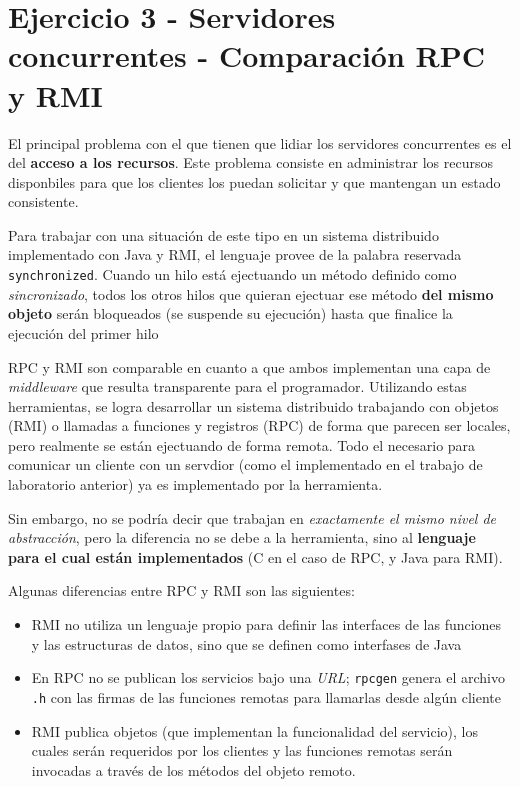 \section{Ejercicio 3 - Servidores concurrentes - Comparación RPC y RMI}

El principal problema con el que tienen que lidiar los servidores concurrentes es el del \textbf{acceso a los recursos}. Este problema consiste en administrar los recursos disponbiles para que los clientes los puedan solicitar y que mantengan un estado consistente. 

Para trabajar con una situación de este tipo en un sistema distribuido implementado con Java y RMI, el lenguaje provee de la palabra reservada \texttt{synchronized}. Cuando un hilo está ejectuando un método definido como \emph{sincronizado}, todos los otros hilos que quieran ejectuar ese método \textbf{del mismo objeto} serán bloqueados (se suspende su ejecución) hasta que finalice la ejecución del primer hilo \autocite{SynchronizedMethods}

RPC y RMI son comparable en cuanto a que ambos implementan una capa de \emph{middleware} que resulta transparente para el programador. Utilizando estas herramientas, se logra desarrollar un sistema distribuido trabajando con objetos (RMI) o llamadas a funciones y registros (RPC) de forma que parecen ser locales, pero realmente se están ejectuando de forma remota. Todo el  necesario para comunicar un cliente con un servdior (como el implementado en el trabajo de laboratorio anterior) ya es implementado por la herramienta.

Sin embargo, no se podría decir que trabajan en \emph{exactamente el mismo nivel de abstracción}, pero la diferencia no se debe a la herramienta, sino al \textbf{lenguaje para el cual están implementados} (C en el caso de RPC, y Java para RMI).  

Algunas diferencias entre RPC y RMI son las siguientes:

\begin{itemize}
    \item RMI no utiliza un lenguaje propio para definir las interfaces de las funciones y las estructuras de datos, sino que se definen como interfases de Java
    \item En RPC no se publican los servicios bajo una \emph{URL}; \texttt{rpcgen} genera el archivo \texttt{.h} con las firmas de las funciones remotas para llamarlas desde algún cliente  
    \item RMI publica objetos (que implementan la funcionalidad del servicio), los cuales serán requeridos por los clientes y las funciones remotas serán invocadas a través de los métodos del objeto remoto.
\end{itemize}


